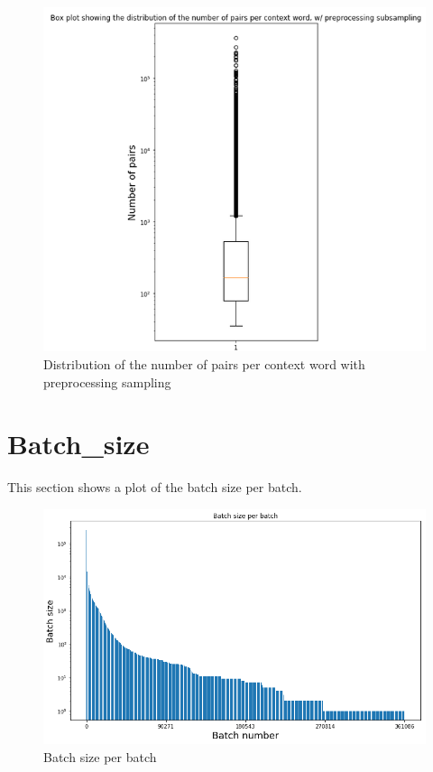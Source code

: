 \documentclass{scrartcl}
\begin{document}
\begin{figure}[h!]
\caption{Distribution of the number of pairs per context word with preprocessing sampling}
\includegraphics[scale=0.45]{preprocessing_sampling_boxplot}
\centering
\end{figure}

\newpage
\section{Batch\_size}
This section shows a plot of the batch size per batch.
\begin{figure}[h!]
\caption{Batch size per batch}
\includegraphics[scale=0.65]{batch_sizes}
\centering
\end{figure}
\end{document}
